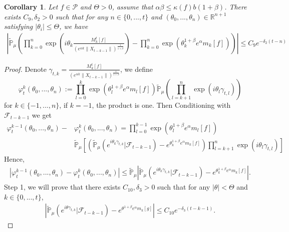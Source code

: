 \documentclass[12pt,oneside,english]{amsart}
\theoremstyle{plain}
\newtheorem{cor}[thm]{Corollary}
\theoremstyle{definition}
\numberwithin{equation}{section}
\begin{document}
\begin{cor}\label{corollary31}
Let $f\in \mathcal{P}$ and $\Theta>0$, assume that $\alpha\beta\leq\kappa(f)b(1+\beta)$. There exists $C_9,\delta_2>0$ such that for any $n \in \{0,...,t\}$ and $(\theta_0,...,\theta_n)\in \mathbb{R}^{n+1}$ satisfying $|\theta_i|\leq \Theta$, we have
\begin{align}
\label{32corollary}
    \left|\mathbb{\tilde{P}}_{\mu}\left(\prod_{k=0}^n\exp(i\theta_k \frac {M_k^t[f]}{(e^{\alpha k}\|X_{t-k-1}\|)^\frac{1}{1+\beta}})-\prod_{k=0}^n\exp(\theta_k^{1+\beta}e^{\alpha}m_k[f])\right)\right|\leq C_9 e^{-\delta_2(t-n)}
\end{align}
\end{cor}
\begin{proof}
    Denote $\gamma_{t,k}=\frac {M_k^t[f]}{(e^{\alpha k}\|X_{t-k-1}\|)^\frac{1}{1+\beta}} $, we define
    $$\varphi^k_t(\theta_0,...,\theta_n):=\prod_{l=0}^{k}\exp\left(\theta_l^{1+\beta}e^{\alpha}m_l[f]\right)\mathbb{\tilde{P}}_{\mu}\left(\prod_{l=k+1}^{n}\exp\left(i\theta_l\gamma_{t,l}\right)\right)$$
    for $k\in\{-1,...,n\}$, if $k=-1$, the product is one. Then Conditioning with $\mathscr{F}_{t-k-1}$ we get
    \begin{align*}
        \varphi^{k-1}_t(\theta_0,...,\theta_n)-&\varphi^{k}_t(\theta_0,...,\theta_n)=\prod_{l=0}^{k-1}\exp\left(\theta_l^{1+\beta}e^{\alpha}m_l[f]\right)\\
        &\mathbb{\tilde{P}}_{\mu}\left[\left(\mathbb{\tilde{P}}_{\mu}\left(e^{i\theta_k \gamma_{t,k}}|\mathscr{F}_{t-k-1}\right)-e^{\theta_k^{1+\beta}e^{\alpha}m_k[f]}\right)\prod_{l=k+1}^n\exp(i\theta_l \gamma_{t,l})\right]
    \end{align*}
    Hence,
    \begin{align*}
        \left|\varphi^{k-1}_t(\theta_0,...,\theta_n)-\varphi^{k}_t(\theta_0,...,\theta_n)\right| \leq \mathbb{\tilde{P}}_{\mu}\left|\mathbb{\tilde{P}}_{\mu}\left(e^{i\theta_k \gamma_{t,k}}|\mathscr{F}_{t-k-1}\right)-e^{\theta_k^{1+\beta}e^{\alpha}m_k[f]}\right|.
    \end{align*}
    Step 1, we will prove that there exists $C_{10},\delta_3>0$ such that for any $|\theta|<\Theta$ and $k\in \{0,...,t\}$,
    \begin{align}
    \label{eq:32step1}
        \left|\mathbb{\tilde{P}}_{\mu}\left(e^{i\theta \gamma_{t,k}}|\mathscr{F}_{t-k-1}\right)-e^{\theta^{1+\beta}e^{\alpha}m_k[g]}\right|\leq C_{10} e^{-\delta_3(t-k-1)}.
    \end{align}


\end{proof}
\end{document}
